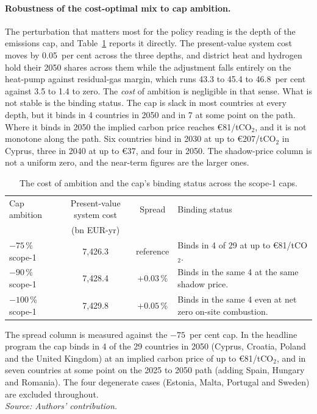 \paragraph{Robustness of the cost-optimal mix to cap ambition.} The perturbation
that matters most for the policy reading is the depth of the emissions cap, and
Table~\ref{tab:costopt_robust} reports it directly. The present-value system cost
moves by 0.05~per cent across the three depths, and district heat and hydrogen hold
their 2050 shares across them while the adjustment falls entirely on the heat-pump
against residual-gas margin, which runs 43.3 to 45.4 to 46.8~per cent against 3.5 to 1.4
to zero. The \emph{cost} of ambition is negligible in that sense.
What is not stable is the binding status. The cap is slack in most
countries at every depth, but it binds in 4 countries in 2050 and in 7 at some
point on the path. Where it binds in 2050 the implied carbon price reaches
\euro{}81/tCO$_2$, and it is not monotone along the path. Six countries bind in 2030
at up to \euro{}207/tCO$_2$ in Cyprus, three in 2040 at up to \euro{}37, and four in
2050. The shadow-price column is not a uniform zero, and the
near-term figures are the larger ones.

\begin{table}[htbp]
  \centering
  \caption{The cost of ambition and the cap's binding status across the scope-1 caps.}
  \label{tab:costopt_robust}
  \small
  \begin{tabularx}{\textwidth}{@{}l c c X@{}}
    \toprule
    Cap ambition & Present-value system cost & Spread & Binding status \\
                 & (bn EUR-yr)               &        &                \\
    \midrule
    $-75$\,\% scope-1  & 7{,}426.3 & reference        & Binds in 4 of 29 at up to \euro{}81/tCO$_2$. \\
    $-90$\,\% scope-1  & 7{,}428.4 & $+0.03$\,\%      & Binds in the same 4 at the same shadow price. \\
    $-100$\,\% scope-1 & 7{,}429.8 & $+0.05$\,\%      & Binds in the same 4 even at net zero on-site combustion. \\
    \bottomrule
  \end{tabularx}
  \par\addvspace{8pt}
  \raggedright\small
  The spread column is measured against the $-75$~per cent cap. In the headline
  program the cap binds in 4 of the 29 countries in 2050 (Cyprus, Croatia, Poland
  and the United Kingdom) at an implied carbon price of up to \euro{}81/tCO$_2$,
  and in seven countries at some point on the 2025 to 2050 path (adding Spain, Hungary
  and Romania). The four degenerate cases (Estonia, Malta, Portugal and Sweden) are
  excluded throughout.
  \\[2pt]{\footnotesize\textit{Source: Authors' contribution.}}
\end{table}

